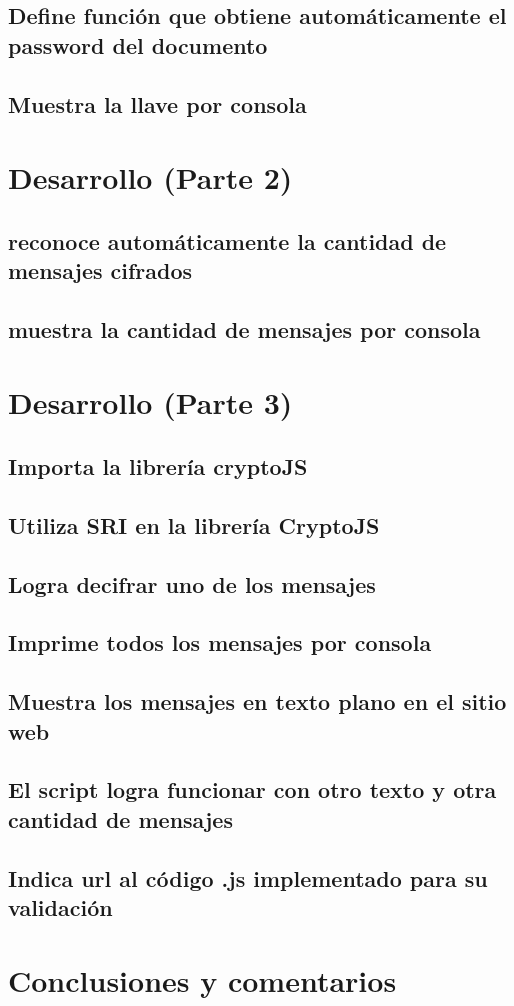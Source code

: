 \documentclass[letter,12pt]{article}
\begin{document}
\subsection{Define función que obtiene automáticamente el password del documento}
\subsection{Muestra la llave por consola}

\section{Desarrollo (Parte 2)}

\subsection{reconoce automáticamente la cantidad de mensajes cifrados}

\subsection{muestra la cantidad de mensajes por consola}

\section{Desarrollo (Parte 3)}

\subsection{Importa la librería cryptoJS}

\subsection{Utiliza SRI en la librería CryptoJS}

\subsection{Logra decifrar uno de los mensajes}

\subsection{Imprime todos los mensajes por consola}

\subsection{Muestra los mensajes en texto plano en el sitio web}

\subsection{El script logra funcionar con otro texto y otra cantidad de mensajes}

\subsection{Indica url al código .js implementado para su validación}



\section*{Conclusiones y comentarios}
\end{document}
